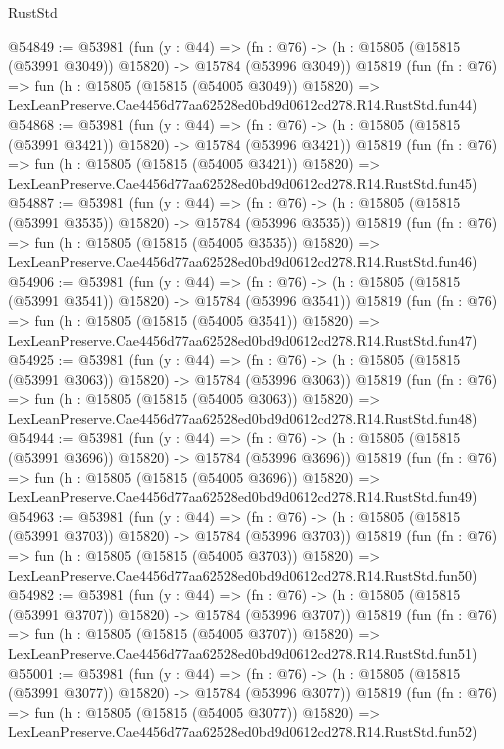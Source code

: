 \begin{lexlean}{RustStd}
\begin{coremodule}
@54849 := @53981
    (fun (y : @44) =>
    (fn : @76) -> (h : @15805 (@15815 (@53991 @3049)) @15820) -> @15784 (@53996 @3049))
    @15819
    (fun (fn : @76) =>
    fun (h : @15805 (@15815 (@54005 @3049)) @15820) =>
    LexLeanPreserve.Cae4456d77aa62528ed0bd9d0612cd278.R14.RustStd.fun44)
@54868 := @53981
    (fun (y : @44) =>
    (fn : @76) -> (h : @15805 (@15815 (@53991 @3421)) @15820) -> @15784 (@53996 @3421))
    @15819
    (fun (fn : @76) =>
    fun (h : @15805 (@15815 (@54005 @3421)) @15820) =>
    LexLeanPreserve.Cae4456d77aa62528ed0bd9d0612cd278.R14.RustStd.fun45)
@54887 := @53981
    (fun (y : @44) =>
    (fn : @76) -> (h : @15805 (@15815 (@53991 @3535)) @15820) -> @15784 (@53996 @3535))
    @15819
    (fun (fn : @76) =>
    fun (h : @15805 (@15815 (@54005 @3535)) @15820) =>
    LexLeanPreserve.Cae4456d77aa62528ed0bd9d0612cd278.R14.RustStd.fun46)
@54906 := @53981
    (fun (y : @44) =>
    (fn : @76) -> (h : @15805 (@15815 (@53991 @3541)) @15820) -> @15784 (@53996 @3541))
    @15819
    (fun (fn : @76) =>
    fun (h : @15805 (@15815 (@54005 @3541)) @15820) =>
    LexLeanPreserve.Cae4456d77aa62528ed0bd9d0612cd278.R14.RustStd.fun47)
@54925 := @53981
    (fun (y : @44) =>
    (fn : @76) -> (h : @15805 (@15815 (@53991 @3063)) @15820) -> @15784 (@53996 @3063))
    @15819
    (fun (fn : @76) =>
    fun (h : @15805 (@15815 (@54005 @3063)) @15820) =>
    LexLeanPreserve.Cae4456d77aa62528ed0bd9d0612cd278.R14.RustStd.fun48)
@54944 := @53981
    (fun (y : @44) =>
    (fn : @76) -> (h : @15805 (@15815 (@53991 @3696)) @15820) -> @15784 (@53996 @3696))
    @15819
    (fun (fn : @76) =>
    fun (h : @15805 (@15815 (@54005 @3696)) @15820) =>
    LexLeanPreserve.Cae4456d77aa62528ed0bd9d0612cd278.R14.RustStd.fun49)
@54963 := @53981
    (fun (y : @44) =>
    (fn : @76) -> (h : @15805 (@15815 (@53991 @3703)) @15820) -> @15784 (@53996 @3703))
    @15819
    (fun (fn : @76) =>
    fun (h : @15805 (@15815 (@54005 @3703)) @15820) =>
    LexLeanPreserve.Cae4456d77aa62528ed0bd9d0612cd278.R14.RustStd.fun50)
@54982 := @53981
    (fun (y : @44) =>
    (fn : @76) -> (h : @15805 (@15815 (@53991 @3707)) @15820) -> @15784 (@53996 @3707))
    @15819
    (fun (fn : @76) =>
    fun (h : @15805 (@15815 (@54005 @3707)) @15820) =>
    LexLeanPreserve.Cae4456d77aa62528ed0bd9d0612cd278.R14.RustStd.fun51)
@55001 := @53981
    (fun (y : @44) =>
    (fn : @76) -> (h : @15805 (@15815 (@53991 @3077)) @15820) -> @15784 (@53996 @3077))
    @15819
    (fun (fn : @76) =>
    fun (h : @15805 (@15815 (@54005 @3077)) @15820) =>
    LexLeanPreserve.Cae4456d77aa62528ed0bd9d0612cd278.R14.RustStd.fun52)

\end{coremodule}
\end{lexlean}

